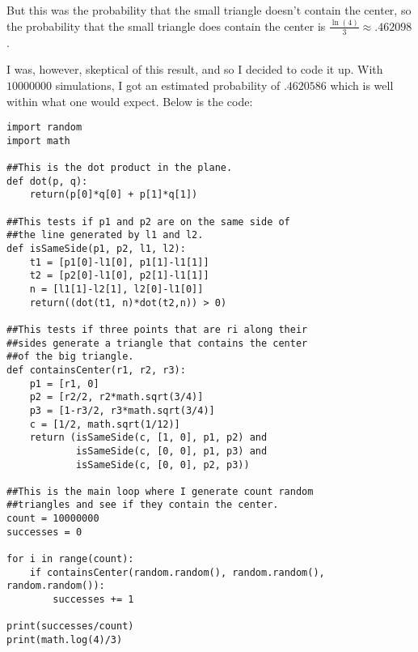 \documentclass[11pt]{article}
\theoremstyle{definition}
\begin{document}
But this was the probability that the small triangle doesn't contain the center, so the probability that the small triangle does contain the center is $\frac{\ln(4)}{3} \approx .462098$.

I was, however, skeptical of this result, and so I decided to code it up.  With $10000000$ simulations, I got an estimated probability of $.4620586$ which is well within what one would expect.  Below is the code:
\begin{verbatim}
import random
import math

##This is the dot product in the plane.
def dot(p, q):
    return(p[0]*q[0] + p[1]*q[1])

##This tests if p1 and p2 are on the same side of
##the line generated by l1 and l2.
def isSameSide(p1, p2, l1, l2):
    t1 = [p1[0]-l1[0], p1[1]-l1[1]]
    t2 = [p2[0]-l1[0], p2[1]-l1[1]]
    n = [l1[1]-l2[1], l2[0]-l1[0]]
    return((dot(t1, n)*dot(t2,n)) > 0)

##This tests if three points that are ri along their
##sides generate a triangle that contains the center
##of the big triangle.
def containsCenter(r1, r2, r3):
    p1 = [r1, 0]
    p2 = [r2/2, r2*math.sqrt(3/4)]
    p3 = [1-r3/2, r3*math.sqrt(3/4)]
    c = [1/2, math.sqrt(1/12)]
    return (isSameSide(c, [1, 0], p1, p2) and
            isSameSide(c, [0, 0], p1, p3) and
            isSameSide(c, [0, 0], p2, p3))

##This is the main loop where I generate count random
##triangles and see if they contain the center.
count = 10000000
successes = 0

for i in range(count):
    if containsCenter(random.random(), random.random(), random.random()):
        successes += 1

print(successes/count)
print(math.log(4)/3)
\end{verbatim}
\end{document}
